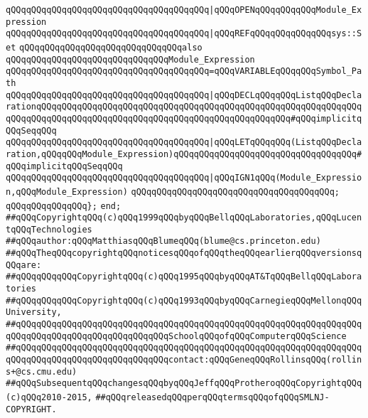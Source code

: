 \verb|qQQqqQQqqQQqqQQqqQQqqQQqqQQqqQQqqQQqqQQq|\verb#|qQQqOPENqQQqqQQqqQQqModule_Expression#\newline
\verb|qQQqqQQqqQQqqQQqqQQqqQQqqQQqqQQqqQQqqQQq|\verb#|qQQqREFqQQqqQQqqQQqqQQqsys::Set#\newline
\newline
\verb|qQQqqQQqqQQqqQQqqQQqqQQqqQQqqQQqalso|\newline
\verb|qQQqqQQqqQQqqQQqqQQqqQQqqQQqqQQqModule_Expression|\newline
\verb|qQQqqQQqqQQqqQQqqQQqqQQqqQQqqQQqqQQqqQQq=qQQqVARIABLEqQQqqQQqSymbol_Path|\newline
\verb|qQQqqQQqqQQqqQQqqQQqqQQqqQQqqQQqqQQqqQQq|\verb#|qQQqDECLqQQqqQQqListqQQqDeclarationqQQqqQQqqQQqqQQqqQQqqQQqqQQqqQQqqQQqqQQqqQQqqQQqqQQqqQQqqQQqqQQqqQQqqQQqqQQqqQQqqQQqqQQqqQQqqQQqqQQqqQQqqQQqqQQqqQQqqQQq#\verb|#qQQqimplicitqQQqSeqqQQq|\newline
\verb|qQQqqQQqqQQqqQQqqQQqqQQqqQQqqQQqqQQqqQQq|\verb#|qQQqLETqQQqqQQq(ListqQQqDeclaration,qQQqqQQqModule_Expression)qQQqqQQqqQQqqQQqqQQqqQQqqQQqqQQqqQQq#\verb|#qQQqimplicitqQQqSeqqQQq|\newline
\verb|qQQqqQQqqQQqqQQqqQQqqQQqqQQqqQQqqQQqqQQq|\verb#|qQQqIGN1qQQq(Module_Expression,qQQqModule_Expression)#\newline
\verb|qQQqqQQqqQQqqQQqqQQqqQQqqQQqqQQqqQQqqQQq;|\newline
\verb|qQQqqQQqqQQqqQQq};|\newline
\verb|end;|\newline
\newline
\newline
\verb|##qQQqCopyrightqQQq(c)qQQq1999qQQqbyqQQqBellqQQqLaboratories,qQQqLucentqQQqTechnologies|\newline
\verb|##qQQqauthor:qQQqMatthiasqQQqBlumeqQQq(blume@cs.princeton.edu)|\newline
\verb|##qQQqTheqQQqcopyrightqQQqnoticesqQQqofqQQqtheqQQqearlierqQQqversionsqQQqare:|\newline
\verb|##qQQqqQQqqQQqCopyrightqQQq(c)qQQq1995qQQqbyqQQqAT&TqQQqBellqQQqLaboratories|\newline
\verb|##qQQqqQQqqQQqCopyrightqQQq(c)qQQq1993qQQqbyqQQqCarnegieqQQqMellonqQQqUniversity,|\newline
\verb|##qQQqqQQqqQQqqQQqqQQqqQQqqQQqqQQqqQQqqQQqqQQqqQQqqQQqqQQqqQQqqQQqqQQqqQQqqQQqqQQqqQQqqQQqqQQqqQQqqQQqSchoolqQQqofqQQqComputerqQQqScience|\newline
\verb|##qQQqqQQqqQQqqQQqqQQqqQQqqQQqqQQqqQQqqQQqqQQqqQQqqQQqqQQqqQQqqQQqqQQqqQQqqQQqqQQqqQQqqQQqqQQqqQQqqQQqcontact:qQQqGeneqQQqRollinsqQQq(rollins+@cs.cmu.edu)|\newline
\verb|##qQQqSubsequentqQQqchangesqQQqbyqQQqJeffqQQqProtheroqQQqCopyrightqQQq(c)qQQq2010-2015,|\newline
\verb|##qQQqreleasedqQQqperqQQqtermsqQQqofqQQqSMLNJ-COPYRIGHT.|\newline

